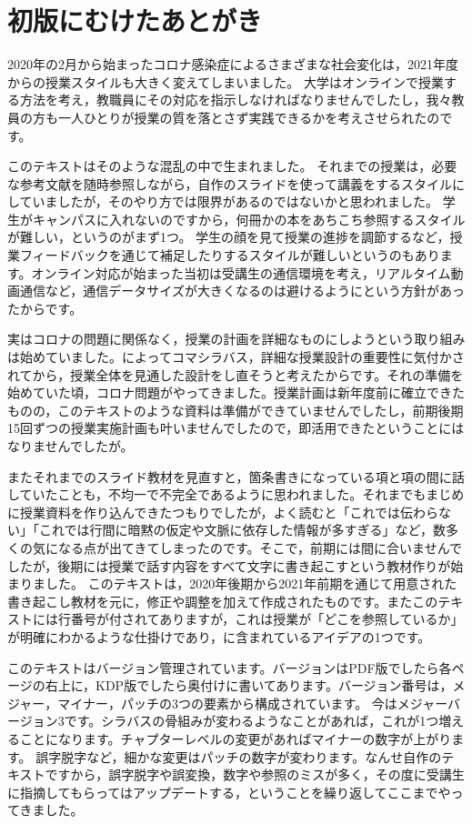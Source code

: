 
\section*{初版にむけたあとがき}

2020年の2月から始まったコロナ感染症によるさまざまな社会変化は，2021年度からの授業スタイルも大きく変えてしまいました。
大学はオンラインで授業する方法を考え，教職員にその対応を指示しなければなりませんでしたし，我々教員の方も一人ひとりが授業の質を落とさず実践できるかを考えさせられたのです。

このテキストはそのような混乱の中で生まれました。
それまでの授業は，必要な参考文献を随時参照しながら，自作のスライドを使って講義をするスタイルにしていましたが，そのやり方では限界があるのではないかと思われました。
学生がキャンパスに入れないのですから，何冊かの本をあちこち参照するスタイルが難しい，というのがまず1つ。
学生の顔を見て授業の進捗を調節するなど，授業フィードバックを通じて補足したりするスタイルが難しいというのもあります。オンライン対応が始まった当初は受講生の通信環境を考え，リアルタイム動画通信など，通信データサイズが大きくなるのは避けるようにという方針があったからです。

実はコロナの問題に関係なく，授業の計画を詳細なものにしようという取り組みは始めていました。\textcite{Ashida2019}によってコマシラバス，詳細な授業設計の重要性に気付かされてから，授業全体を見通した設計をし直そうと考えたからです。それの準備を始めていた頃，コロナ問題がやってきました。授業計画は新年度前に確立できたものの，このテキストのような資料は準備ができていませんでしたし，前期後期15回ずつの授業実施計画も叶いませんでしたので，即活用できたということにはなりませんでしたが。

またそれまでのスライド教材を見直すと，箇条書きになっている項と項の間に話していたことも，不均一で不完全であるように思われました。それまでもまじめに授業資料を作り込んできたつもりでしたが，よく読むと「これでは伝わらない」「これでは行間に暗黙の仮定や文脈に依存した情報が多すぎる」など，数多くの気になる点が出てきてしまったのです。そこで，前期には間に合いませんでしたが，後期には授業で話す内容をすべて文字に書き起こすという教材作りが始まりました。
このテキストは，2020年後期から2021年前期を通じて用意された書き起こし教材を元に，修正や調整を加えて作成されたものです。またこのテキストには行番号が付されてありますが，これは授業が「どこを参照しているか」が明確にわかるような仕掛けであり，\textcite{Ashida2019}に含まれているアイデアの1つです。

このテキストはバージョン管理されています。バージョンはPDF版でしたら各ページの右上に，KDP版でしたら奥付けに書いてあります。バージョン番号は，メジャー，マイナー，パッチの3つの要素から構成されています。
今はメジャーバージョン3です。シラバスの骨組みが変わるようなことがあれば，これが1つ増えることになります。チャプターレベルの変更があればマイナーの数字が上がります。
誤字脱字など，細かな変更はパッチの数字が変わります。なんせ自作のテキストですから，誤字脱字や誤変換，数字や参照のミスが多く，その度に受講生に指摘してもらってはアップデートする，ということを繰り返してここまでやってきました。

